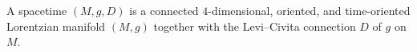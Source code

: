A spacetime $(M, g, D)$ is a connected $4$-dimensional, oriented, and time-oriented Lorentzian manifold $(M, g)$ together with the Levi–Civita connection $D$ of $g$ on $M$.
